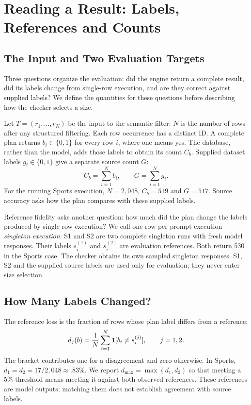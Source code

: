 \section{Reading a Result: Labels, References and Counts}
\label{sec:objects}
\subsection{The Input and Two Evaluation Targets}
Three questions organize the evaluation: did the engine return a complete result, did its labels change from single-row execution, and are they correct against supplied labels? We define the quantities for these questions before describing how the checker selects a size.

Let $T=(r_1,\ldots,r_N)$ be the input to the semantic filter: $N$ is the number of rows after any structured filtering. Each row occurrence has a distinct ID. A complete plan returns $b_i\in\{0,1\}$ for every row $i$, where one means yes. The database, rather than the model, adds those labels to obtain its count $C_b$. Supplied dataset labels $g_i\in\{0,1\}$ give a separate source count $G$:
\begin{equation}
C_b=\sum_{i=1}^{N}b_i,\qquad G=\sum_{i=1}^{N}g_i.
\label{eq:counts}
\end{equation}
For the running Sports execution, $N=2,048$, $C_b=519$ and $G=517$. Source accuracy asks how the plan compares with these supplied labels.

Reference fidelity asks another question: how much did the plan change the labels produced by single-row execution? We call one-row-per-prompt execution \emph{singleton execution}. S1 and S2 are two complete singleton runs with fresh model responses. Their labels $s_i^{(1)}$ and $s_i^{(2)}$ are evaluation references. Both return 530 in the Sports case. The checker obtains its own sampled singleton responses. S1, S2 and the supplied source labels are used only for evaluation; they never enter size selection.

\subsection{How Many Labels Changed?}
The reference loss is the fraction of rows whose plan label differs from a reference:
\begin{equation}
d_j(b)=\frac{1}{N}\sum_{i=1}^{N}\mathbf{1}[b_i\ne s_i^{(j)}],\qquad j=1,2.
\label{eq:fidelity}
\end{equation}
The bracket contributes one for a disagreement and zero otherwise. In Sports, $d_1=d_2=17/2,048\approx.83\%$. We report $d_{\max}=\max(d_1,d_2)$ so that meeting a 5\% threshold means meeting it against both observed references. These references are model outputs; matching them does not establish agreement with source labels.

